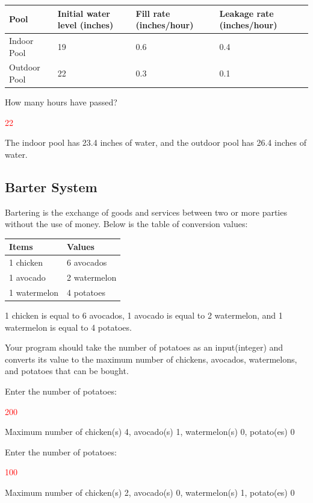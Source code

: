 \begin{table}[H]
    \centering
    \begin{tabular}{|p{1 in}|p{1.5 in}|p{1.5 in}|p{1.5 in}|} \hline
    \textbf{Pool} & \textbf{Initial water level (inches)} & \textbf{Fill rate (inches/hour)} & \textbf{Leakage rate (inches/hour)} \\ \hline
    Indoor Pool & 19 & 0.6 & 0.4 \\ \hline
    Outdoor Pool & 22 & 0.3 & 0.1 \\ \hline
    \end{tabular}
\end{table}

\begin{sample}
How many hours have passed?

\textcolor{red}{22}

The indoor pool has 23.4 inches of water, and the outdoor pool has 26.4 inches of water.

\end{sample}

\subsection{Barter System}
Bartering is the exchange of goods and services between two or more parties without the use of money. Below is the table of conversion values:

\begin{table}[H]
    \centering
    \begin{tabular}{|p{1 in}|p{1 in}|} \hline
    \textbf{Items} & \textbf{Values} \\ \hline
    1 chicken & 6 avocados \\ \hline
    1 avocado & 2 watermelon \\ \hline
    1 watermelon & 4 potatoes \\ \hline
    \end{tabular}
\end{table}

1 chicken is equal to 6 avocados, 1 avocado is equal to 2 watermelon, and 1 watermelon is equal to 4 potatoes.

Your program should take the number of potatoes as an input(integer) and converts its value to the maximum number of chickens, avocados, watermelons, and potatoes that can be bought.

\begin{sample}
Enter the number of potatoes:

\textcolor{red}{200}

Maximum number of chicken(s) 4, avocado(s) 1, watermelon(s) 0, potato(es) 0

\end{sample}

\begin{sample}
Enter the number of potatoes:

\textcolor{red}{100}

Maximum number of chicken(s) 2, avocado(s) 0, watermelon(s) 1, potato(es) 0

\end{sample}